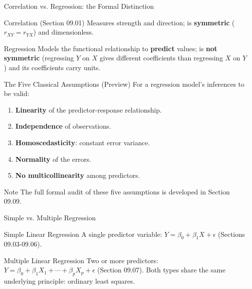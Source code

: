 \documentclass[10pt, aspectratio=169]{beamer}
\begin{document}
\begin{frame}{Correlation vs. Regression: the Formal Distinction}
  \footnotesize
  \begin{block}{Correlation (Section 09.01)}
    Measures strength and direction; is \textbf{symmetric} ($r_{XY}=r_{YX}$) and dimensionless.
  \end{block}
  \pause

  \vspace{0.1cm}
  \begin{alertblock}{Regression}
    Models the functional relationship to \textbf{predict} values; is \textbf{not symmetric} (regressing $Y$ on $X$ gives different coefficients than regressing $X$ on $Y$) and its coefficients carry units.
  \end{alertblock}
\end{frame}

\begin{frame}{The Five Classical Assumptions (Preview)}
  \footnotesize
  For a regression model's inferences to be valid:
  \begin{enumerate}\itemsep=0.06cm
    \item \textbf{Linearity} of the predictor-response relationship. \pause
    \item \textbf{Independence} of observations. \pause
    \item \textbf{Homoscedasticity}: constant error variance. \pause
    \item \textbf{Normality} of the errors. \pause
    \item \textbf{No multicollinearity} among predictors.
  \end{enumerate}
  \vspace{0.05cm}
  \begin{alertblock}{Note}
    The full formal audit of these five assumptions is developed in Section 09.09.
  \end{alertblock}
\end{frame}

\begin{frame}{Simple vs. Multiple Regression}
  \footnotesize
  \begin{block}{Simple Linear Regression}
    A single predictor variable: $Y=\beta_0+\beta_1X+\epsilon$ (Sections 09.03-09.06).
  \end{block}
  \pause

  \vspace{0.1cm}
  \begin{alertblock}{Multiple Linear Regression}
    Two or more predictors: $Y=\beta_0+\beta_1X_1+\cdots+\beta_pX_p+\epsilon$ (Section 09.07). Both types share the same underlying principle: ordinary least squares.
  \end{alertblock}
\end{frame}
\end{document}
